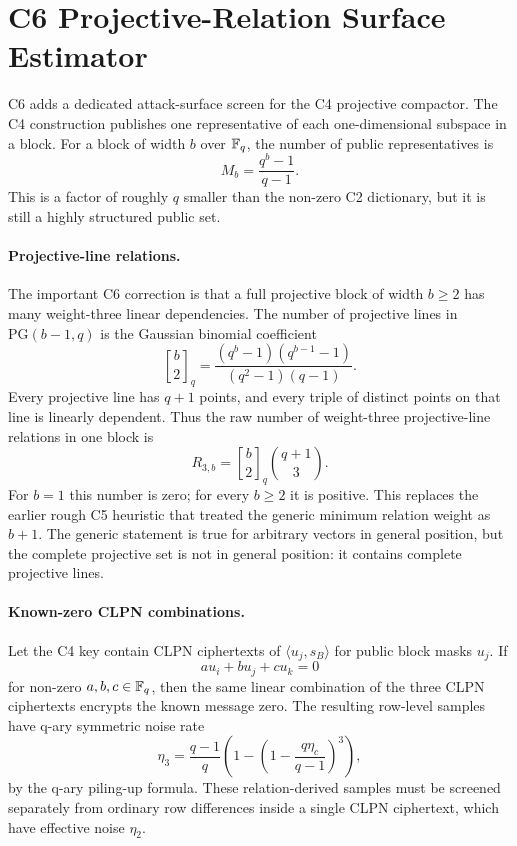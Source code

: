 \section{C6 Projective-Relation Surface Estimator}
\label{app:c6-relation-surface}

C6 adds a dedicated attack-surface screen for the C4 projective compactor.
The C4 construction publishes one representative of each one-dimensional
subspace in a block.  For a block of width $b$ over $\mathbb{F}_q$, the number of
public representatives is
\[
    M_b = \frac{q^b-1}{q-1}.
\]
This is a factor of roughly $q$ smaller than the non-zero C2 dictionary, but
it is still a highly structured public set.

\paragraph{Projective-line relations.}
The important C6 correction is that a full projective block of width
$b\geq 2$ has many weight-three linear dependencies.  The number of
projective lines in $\mathrm{PG}(b-1,q)$ is the Gaussian binomial coefficient
\[
    {b \brack 2}_q
    =
    \frac{(q^b-1)(q^{b-1}-1)}{(q^2-1)(q-1)}.
\]
Every projective line has $q+1$ points, and every triple of distinct points
on that line is linearly dependent.  Thus the raw number of weight-three
projective-line relations in one block is
\[
    R_{3,b}
    =
    {b \brack 2}_q {q+1 \choose 3}.
\]
For $b=1$ this number is zero; for every $b\geq 2$ it is positive.  This
replaces the earlier rough C5 heuristic that treated the generic minimum
relation weight as $b+1$.  The generic statement is true for arbitrary
vectors in general position, but the complete projective set is not in
general position: it contains complete projective lines.

\paragraph{Known-zero CLPN combinations.}
Let the C4 key contain CLPN ciphertexts of
$\langle u_j,s_B\rangle$ for public block masks $u_j$.  If
\[
    a u_i + b u_j + c u_k = 0
\]
for non-zero $a,b,c\in\mathbb{F}_q$, then the same linear combination of the three
CLPN ciphertexts encrypts the known message zero.  The resulting row-level
samples have q-ary symmetric noise rate
\[
    \eta_3
    =
    \frac{q-1}{q}
    \left(1-
    \left(1-\frac{q\eta_c}{q-1}\right)^3
    \right),
\]
by the q-ary piling-up formula.  These relation-derived samples must be
screened separately from ordinary row differences inside a single CLPN
ciphertext, which have effective noise $\eta_2$.

